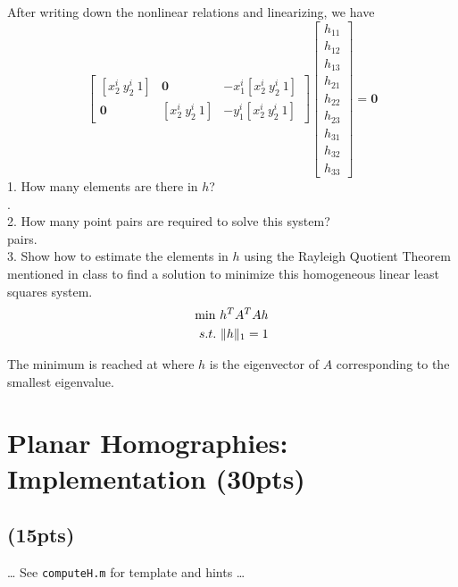 \documentclass[12pt]{article}
\begin{document}
After writing down the nonlinear relations and linearizing, we have
\begin{equation}
\left[ \begin{matrix}
    [x_2^i\ y_2^i\ 1] & \mathbf{0} & -x_1^i[x_2^i\ y_2^i\ 1] \\
    \mathbf{0} & [x_2^i\ y_2^i\ 1] & -y_1^i[x_2^i\ y_2^i\ 1]
 \end{matrix} \right]
 \left[ \begin{matrix}
	 h_{11}\\
	 h_{12}\\
	 h_{13}\\
	 h_{21}\\
	 h_{22}\\
	 h_{23}\\
	 h_{31}\\
	 h_{32}\\
	 h_{33}
 \end{matrix} \right] = \mathbf{0}
\end{equation}
1. How many elements are there in $h$?\\
.\\
2. How many point pairs are required to solve this system?\\
 pairs.\\
3. Show how to estimate the elements in $h$ using the Rayleigh Quotient Theorem mentioned in class to find a solution to minimize this homogeneous linear least squares system.\\
\begin{equation*}
\begin{split}
 \textup{min}\ h^T A^T A h \\
 s.t.\ \|h\|_1 = 1	
 \end{split}
\end{equation*}

The minimum is reached at where $h$ is the eigenvector of $A$ corresponding to the smallest eigenvalue.

\section{Planar Homographies: Implementation (30pts)}


\subsection{(15pts)}

\ldots
See {\tt computeH.m} for template and hints
\ldots
\end{document}
